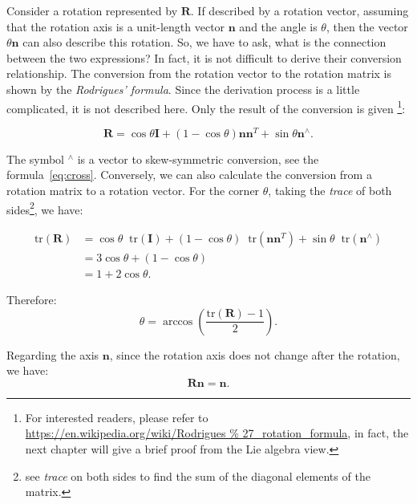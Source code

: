 Consider a rotation represented by $ \mathbf{R} $. If described by a rotation vector, assuming that the rotation axis is a unit-length vector $ \mathbf{n} $ and the angle is $ \theta $, then the vector $ \theta \mathbf{n} $ can also describe this rotation. So, we have to ask, what is the connection between the two expressions? In fact, it is not difficult to derive their conversion relationship. The conversion from the rotation vector to the rotation matrix is shown by the \textit{Rodrigues' formula}. Since the derivation process is a little complicated, it is not described here. Only the result of the conversion is given \footnote{For interested readers, please refer to \url{https://en.wikipedia.org/wiki/Rodrigues \% 27_rotation_formula}, in fact, the next chapter will give a brief proof from the Lie algebra view.}:

\begin{equation}
\label{eq:rogridues}
\mathbf{R} = \cos \theta \mathbf{I} + \left({ 1 - \cos \theta } \right) \mathbf{n} { \mathbf {n} ^T } + \sin \theta { \mathbf{n}^ \wedge }.
\end{equation}

The symbol $ ^ \wedge $ is a vector to skew-symmetric conversion, see the formula~\eqref{eq:cross}. Conversely, we can also calculate the conversion from a rotation matrix to a rotation vector. For the corner $ \theta $, taking the \textit{trace} of both sides\footnote {see \textit{trace} on both sides to find the sum of the diagonal elements of the matrix. }, we have:

\begin{equation}
\begin{aligned}
\mathrm{tr} \left( \mathbf{R} \right) &= \cos \theta \mathop{}\!\mathrm{tr}\left( \mathbf{I} \right) + \left( {1 - \cos \theta } \right) \mathop{}\!\mathrm{tr} \left( { \mathbf{n} {\mathbf{n}^T}} \right) + \sin \theta \mathop{}\!\mathrm{tr} ({\mathbf{n}^ \wedge })\\
&= 3\cos \theta  + (1 - \cos \theta )\\
&= 1 + 2\cos \theta .
\end{aligned} 
\end{equation}

Therefore:
\begin{equation}
\label{eq:R2theta}
\theta = \arccos ( \frac{\mathrm{tr}(\mathbf{R}) - 1}{2}  ) .
\end{equation}

Regarding the axis $ \mathbf{n} $, since the rotation axis does not change after the rotation, we have:
\begin{equation}
\mathbf{R} \mathbf{n} = \mathbf{n}.
\end{equation}

